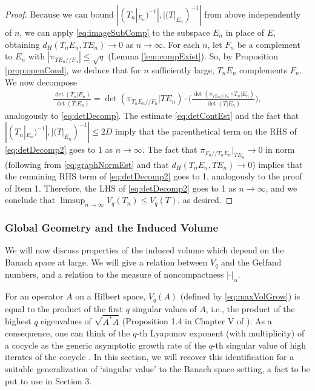 \documentclass[11pt]{amsart}
\theoremstyle{theorem}
\theoremstyle{definition}
\numberwithin{equation}{section}
\renewcommand{\a}{\alpha}
\newcommand{\ds}{/ \! /}
\begin{document}
\begin{proof}
Because we can bound $|(T_n|_{E_n})^{-1}|, |(T|_{E_n})^{-1}|$ from above independently of $n$, we can apply \eqref{eq:imageSubComp} to the subspace $E_n$ in place of $E$, obtaining $d_H(T_n E_n, T E_n) \to 0$ as $n \to \infty$. For each $n$, let $F_n$ be a complement to $E_n$ with $|\pi_{T E_n \ds F_n} | \leq \sqrt{q}$ (Lemma \ref{lem:compExist}). So, by Proposition \ref{prop:openCond}, we deduce that for $n$ sufficiently large, $T_n E_n$ complements $F_n$. We now decompose
\begin{align}\label{eq:detDecomp2}
\frac{\det(T_n | E_n)}{ \det(T | E_n)} = \det(\pi_{T_n E_n \ds F_n} | T E_n) \cdot \bigg( \frac{\det(\pi_{T E_n \ds F_n} \circ T_n |E_n)}{\det(T | E_n)}\bigg),
\end{align}
analogously to \eqref{eq:detDecomp}. The estimate \eqref{eq:detContEst} and the fact that $|(T_n|_{E_n})^{-1}|, |(T|_{E_n})^{-1}| \leq 2D$ imply that the parenthetical term on the RHS of \eqref{eq:detDecomp2} goes to $1$ as $n \to \infty$. The fact that $\pi_{F_n \ds T_n E_n}|_{T E_n} \to 0$ in norm (following from \eqref{eq:graphNormEst} and that $d_H(T_n E_n, T E_n) \to 0$) implies that the remaining RHS term of \eqref{eq:detDecomp2} goes to 1, analogously to the proof of Item 1. Therefore, the LHS of \eqref{eq:detDecomp2} goes to 1 as $n \to \infty$, and we conclude that $\limsup_{n \to \infty} V_q(T_n) \leq  V_q(T) $, as desired.
\end{proof}

\subsubsection{Global Geometry and the Induced Volume}

We will now discuss properties of the induced volume which depend on the Banach space at large. We will give a relation between $V_q$ and the Gelfand numbers, and a relation to the measure of noncompactness $|\cdot|_{\a}$.

\smallskip
{}

For an operator $A$ on a Hilbert space, $V_q(A)$ (defined by \eqref{eq:maxVolGrow}) is equal to the product of the first $q$ singular values of $A$, i.e., the product of the highest $q$ eigenvalues of $\sqrt{A^* A}$ (Proposition 1.4 in Chapter V of \cite{Temam}).  As a consequence, one can think of the $q$-th Lyapunov exponent (with multiplicity) of a cocycle as the generic asymptotic growth rate of the $q$-th singular value of high iterates of the cocycle \cite{Ra, R1}. In this section, we will recover this identification for a suitable generalization of `singular value' to the Banach space setting, a fact to be put to use in Section 3.
\end{document}
